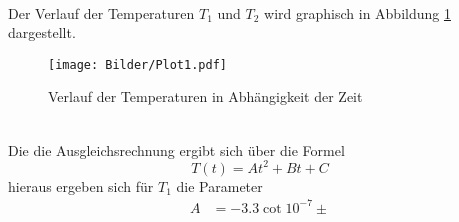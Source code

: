 \\
Der Verlauf der Temperaturen $T_1$ und $T_2$ wird graphisch in Abbildung
\ref{fig:T1T2} dargestellt.
\begin{figure}[h]
  \centering
  \texttt{[image: Bilder/Plot1.pdf]}
  \caption{Verlauf der Temperaturen in Abhängigkeit der Zeit}
  \label{fig:T1T2}
\end{figure}
\\
Die die Ausgleichsrechnung ergibt sich über die Formel
\begin{equation*}
  T(t) = At^2+Bt+C
\end{equation*}
hieraus ergeben sich für $T_1$ die Parameter
\begin{align*}
  A &= -3.3\cot10^{-7} \pm
\end{align*}
